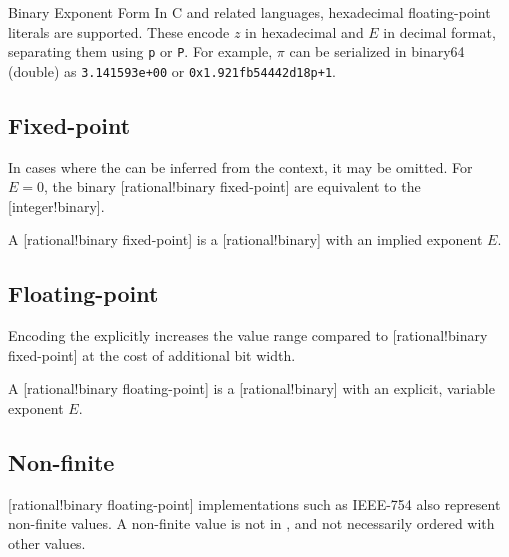 \begin{highlight}{Binary Exponent Form}
    In C and related languages, hexadecimal floating-point literals are supported.
    These encode \(z\) in hexadecimal and \(E\) in decimal format, separating them using \texttt{p} or \texttt{P}.
    For example, \(\pi\) can be serialized in binary64 (double) as \texttt{3.141593e+00} or \texttt{0x1.921fb54442d18p+1}.
\end{highlight}

\subsection{Fixed-point}

In cases where the  can be inferred from the context, it may be omitted.
For \(E=0\), the binary [rational!binary fixed-point] are equivalent to the [integer!binary].

\begin{definition}
    A [rational!binary fixed-point] is a [rational!binary] with an implied exponent \(E\).
\end{definition}

\subsection{Floating-point}

Encoding the  explicitly increases the value range compared to [rational!binary fixed-point] at the cost of additional bit width.

\begin{definition}
    A [rational!binary floating-point] is a [rational!binary] with an explicit, variable exponent \(E\).
\end{definition}

\subsection{Non-finite}
\label{sec:non_finite}

[rational!binary floating-point] implementations such as IEEE-754 \cite{IEEE_754} also represent non-finite values.
A non-finite value is not in \Rat{}, and not necessarily ordered with other values.

